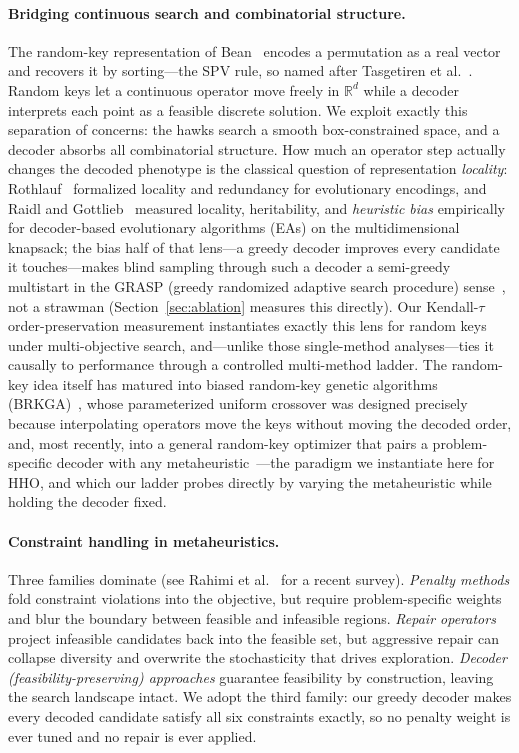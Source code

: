 \documentclass[runningheads]{llncs}
\begin{document}
\paragraph{Bridging continuous search and combinatorial structure.}
The random-key representation of Bean~\cite{bean} encodes a permutation as a real vector and recovers it by sorting---the SPV rule, so named after Tasgetiren et al.~\cite{tasgetiren}. Random keys let a continuous operator move freely in $\mathbb{R}^{d}$ while a decoder interprets each point as a feasible discrete solution. We exploit exactly this separation of concerns: the hawks search a smooth box-constrained space, and a decoder absorbs all combinatorial structure. How much an operator step actually changes the decoded phenotype is the classical question of representation \emph{locality}: Rothlauf~\cite{rothlauf} formalized locality and redundancy for evolutionary encodings, and Raidl and Gottlieb~\cite{raidl} measured locality, heritability, and \emph{heuristic bias} empirically for decoder-based evolutionary algorithms (EAs) on the multidimensional knapsack; the bias half of that lens---a greedy decoder improves every candidate it touches---makes blind sampling through such a decoder a semi-greedy multistart in the GRASP (greedy randomized adaptive search procedure) sense~\cite{feo}, not a strawman (Section~\ref{sec:ablation} measures this directly). Our Kendall-$\tau$ order-preservation measurement instantiates exactly this lens for random keys under multi-objective search, and---unlike those single-method analyses---ties it causally to performance through a controlled multi-method ladder. The random-key idea itself has matured into biased random-key genetic algorithms (BRKGA)~\cite{goncalves,londe}, whose parameterized uniform crossover was designed precisely because interpolating operators move the keys without moving the decoded order, and, most recently, into a general random-key optimizer that pairs a problem-specific decoder with any metaheuristic~\cite{chaves}---the paradigm we instantiate here for HHO, and which our ladder probes directly by varying the metaheuristic while holding the decoder fixed.

\paragraph{Constraint handling in metaheuristics.}
Three families dominate (see Rahimi et al.~\cite{rahimi} for a recent survey). \emph{Penalty methods} fold constraint violations into the objective, but require problem-specific weights and blur the boundary between feasible and infeasible regions. \emph{Repair operators} project infeasible candidates back into the feasible set, but aggressive repair can collapse diversity and overwrite the stochasticity that drives exploration. \emph{Decoder (feasibility-preserving) approaches} guarantee feasibility by construction, leaving the search landscape intact. We adopt the third family: our greedy decoder makes every decoded candidate satisfy all six constraints exactly, so no penalty weight is ever tuned and no repair is ever applied.
\end{document}
